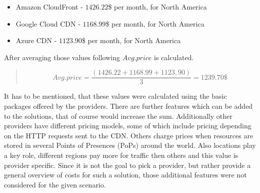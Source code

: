 \begin{itemize}[noitemsep]
	\item Amazon CloudFront - $1426.22$\$ per month, for North America
	\item Google Cloud CDN - $1168.99$\$ per month, for North America
	\item Azure CDN - $1123.90$\$ per month, for North America
\end{itemize} 

After averaging those values following $Avg. price$ is calculated.  

\begin{quote}
	\begin{center}
		\begin{equation*}
			Avg. price = 
			\frac{
				\left(1426.22 + 1168.99 + 1123,90\right)
			}{
				3
			} = 1239.70  \$
		\end{equation*}
	\end{center} 
\end{quote}

It has to be mentioned, that these values were calculated using the basic packages offered by the providers. There are further features which can be added to the solutions, that of course would increase the sum. Additionally other providers have different pricing models, some of which include pricing depending on the HTTP requests sent to the CDN. Others charge prices when resources are stored in several Points of Presences (PoPs) around the world. Also locations play a key role, different regions pay more for traffic then others and this value is provider specific.
Since it is not the goal to pick a provider, but rather provide a general overview of costs for such a solution, those additional features were not considered for the given scenario.



